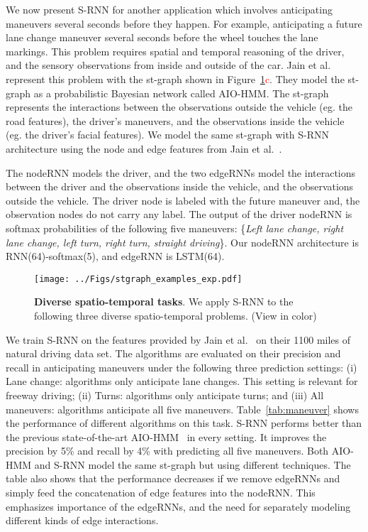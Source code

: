\documentclass[10pt,twocolumn,letterpaper]{article}
\newcommand{\rc}[1]{\textcolor{red}{#1}}
\begin{document}
We now present S-RNN for another application which involves anticipating maneuvers several seconds before they happen. For example, anticipating a future lane change maneuver several seconds before the wheel touches the lane markings. This problem requires spatial and temporal reasoning of the driver, and the sensory observations from inside and outside of the car. Jain et al.~\cite{Jain15} represent this problem with the st-graph shown in Figure~\ref{fig:stgraphexp}\rc{c}. They model the st-graph as a probabilistic Bayesian network called AIO-HMM. The st-graph represents the interactions between the observations outside the vehicle (eg. the road features), the driver's maneuvers, and the observations inside the vehicle (eg. the driver's facial features). We model the same st-graph with S-RNN architecture using the node and edge features from Jain et al.~\cite{Jain15}.

The nodeRNN models the driver, and the two edgeRNNs model the interactions between the driver and the observations inside the vehicle, and the observations outside the vehicle. The driver node is labeled with the future maneuver and, the observation nodes do not carry any label. The output of the driver nodeRNN is softmax probabilities of the following five maneuvers: \{\textit{Left lane change, right lane change, left turn, right turn, straight driving}\}.  Our nodeRNN architecture is RNN(64)-softmax(5), and edgeRNN is LSTM(64).

\begin{figure}[t]
\centering
\texttt{[image: ../Figs/stgraph\_examples\_exp.pdf]}
\caption{\footnotesize{\textbf{Diverse spatio-temporal tasks}. We apply S-RNN to the following three diverse spatio-temporal problems. (View in color)}}
\label{fig:stgraphexp}
\end{figure}

We train S-RNN on the features provided by Jain et al.~\cite{Jain15} on their 1100 miles of natural driving data set. The algorithms are evaluated on their precision and recall in anticipating maneuvers  under the following three prediction
settings: (i) Lane change: algorithms only anticipate lane changes. This setting is relevant for freeway driving; (ii) Turns: algorithms only anticipate turns; and (iii) All maneuvers: algorithms anticipate all five maneuvers. Table~\ref{tab:maneuver} shows the performance of different algorithms on this task.  S-RNN performs better than the previous state-of-the-art AIO-HMM~\cite{Jain15} in every setting.  It improves the precision  by 5\% and recall by 4\% with predicting all five maneuvers. Both AIO-HMM and S-RNN model the same st-graph but using different techniques. The table also shows that the performance decreases if we remove edgeRNNs and simply feed the concatenation of edge features into the nodeRNN. This emphasizes importance of the edgeRNNs,  and the need for separately modeling different kinds of edge interactions. 
\end{document}
